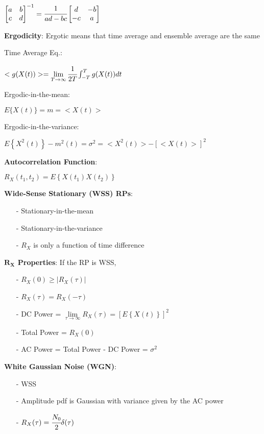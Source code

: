 \documentclass{article}
\newcommand{\expect}[1]{E\left\{ #1 \right\}}
\newcommand{\sect}[1]{\noindent\textbf{#1}:}
\begin{document}
\begin{small}
\begin{multicols*}{2}
		$\begin{bmatrix} a & b \\ c & d \end{bmatrix}^{-1} = \cfrac{1}{ad-bc} \begin{bmatrix} d & -b \\ -c & a \end{bmatrix}$
		
		\sect{Ergodicity} Ergotic means that time average and ensemble average are the same
		
		\noindent Time Average Eq.:
		
		$<g(X(t))> = \lim\limits_{T\rightarrow \infty} \cfrac{1}{2T} \int^T_{-T} g(X(t))dt$
		
		\noindent Ergodic-in-the-mean:
		
		$E\{X(t)\} = m = <X(t)>$
		
		\noindent Ergodic-in-the-variance:
		
		$\expect{X^2(t)}-m^2(t) = \sigma^2 = <X^2(t)> - \left[ <X(t)> \right]^2$
		
		\sect{Autocorrelation Function}
		
		$R_X(t_1, t_2) = \expect{X(t_1)X(t_2)}$
		
		\sect{Wide-Sense Stationary (WSS) RPs}
		\begin{itemize}
			\item[-] Stationary-in-the-mean
			\item[-] Stationary-in-the-variance
			\item[-] $R_{X}$ is only a function of time difference
		\end{itemize}
	
		\sect{$\mathbf{R_X}$ Properties} If the RP is WSS,
		\begin{itemize}
			\item[-] $R_X(0) \geq |R_X(\tau)|$ 
			\item[-] $R_X(\tau) = R_X(-\tau)$
			\item[-] DC Power = $\lim\limits_{\tau \rightarrow \infty} R_X(\tau) = \left[\expect{X(t)}\right]^2$
			\item[-] Total Power = $R_X(0)$
			\item[-] AC Power = Total Power - DC Power = $\sigma^2$
		\end{itemize}
	
		\sect{White Gaussian Noise (WGN)}
		\begin{itemize}
			\item[-] WSS
			\item[-] Amplitude pdf is Gaussian with variance given by the AC power
			\item[-] $R_X(\tau) = \cfrac{N_0}{2} \delta(\tau)$
		\end{itemize}
	

\end{multicols*}
\end{small}
\end{document}
